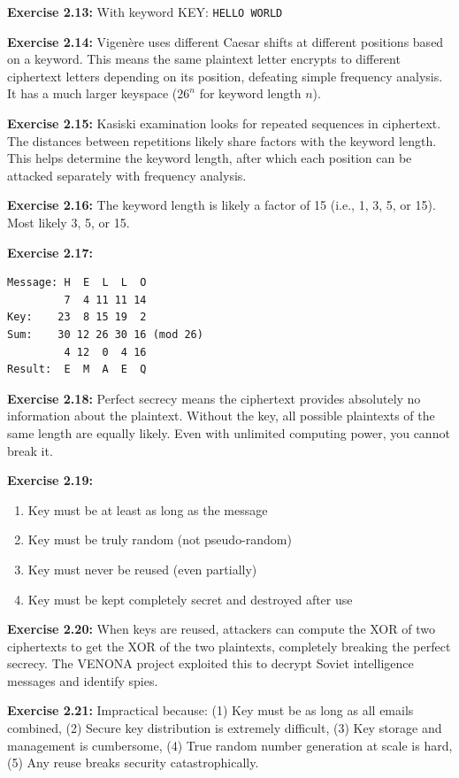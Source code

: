 \documentclass[11pt,a4paper]{report}
\begin{document}
\textbf{Exercise 2.13:}
With keyword KEY: \texttt{HELLO WORLD}

\textbf{Exercise 2.14:}
Vigenère uses different Caesar shifts at different positions based on a keyword. This means the same plaintext letter encrypts to different ciphertext letters depending on its position, defeating simple frequency analysis. It has a much larger keyspace ($26^n$ for keyword length $n$).

\textbf{Exercise 2.15:}
Kasiski examination looks for repeated sequences in ciphertext. The distances between repetitions likely share factors with the keyword length. This helps determine the keyword length, after which each position can be attacked separately with frequency analysis.

\textbf{Exercise 2.16:}
The keyword length is likely a factor of 15 (i.e., 1, 3, 5, or 15). Most likely 3, 5, or 15.

\textbf{Exercise 2.17:}
\begin{verbatim}
Message: H  E  L  L  O
         7  4 11 11 14
Key:    23  8 15 19  2
Sum:    30 12 26 30 16 (mod 26)
         4 12  0  4 16
Result:  E  M  A  E  Q
\end{verbatim}

\textbf{Exercise 2.18:}
Perfect secrecy means the ciphertext provides absolutely no information about the plaintext. Without the key, all possible plaintexts of the same length are equally likely. Even with unlimited computing power, you cannot break it.

\textbf{Exercise 2.19:}
\begin{enumerate}
    \item Key must be at least as long as the message
    \item Key must be truly random (not pseudo-random)
    \item Key must never be reused (even partially)
    \item Key must be kept completely secret and destroyed after use
\end{enumerate}

\textbf{Exercise 2.20:}
When keys are reused, attackers can compute the XOR of two ciphertexts to get the XOR of the two plaintexts, completely breaking the perfect secrecy. The VENONA project exploited this to decrypt Soviet intelligence messages and identify spies.

\textbf{Exercise 2.21:}
Impractical because: (1) Key must be as long as all emails combined, (2) Secure key distribution is extremely difficult, (3) Key storage and management is cumbersome, (4) True random number generation at scale is hard, (5) Any reuse breaks security catastrophically.
\end{document}

